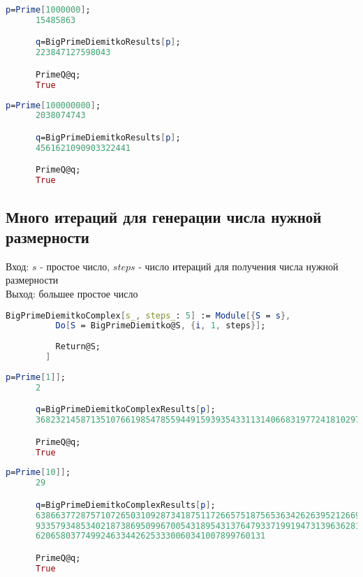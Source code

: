       \begin{lstlisting}[language=Mathematica,caption={Пример 1}]
      p=Prime[1000000];
      15485863

      q=BigPrimeDiemitkoResults[p];
      223847127598043

      PrimeQ@q;
      True
      \end{lstlisting}

      \begin{lstlisting}[language=Mathematica,caption={Пример 2}]
      p=Prime[100000000];
      2038074743

      q=BigPrimeDiemitkoResults[p];
      4561621090903322441

      PrimeQ@q;
      True
      \end{lstlisting}

    \subsection{Много итераций для генерации числа нужной размерности}
    
      Вход: {$s$} - простое число, {$steps$} - число итераций для получения числа нужной размерности \\
      Выход: большее простое число

      \begin{lstlisting}[language=Mathematica,caption={
	     Теорема Диемитко (много итераций)
      }]
    	BigPrimeDiemitkoComplex[s_, steps_: 5] := Module[{S = s},
    	  Do[S = BigPrimeDiemitko@S, {i, 1, steps}];
      
    	  Return@S;
    	]
      \end{lstlisting}

      \begin{lstlisting}[language=Mathematica,caption={Пример 1}]
      p=Prime[1]];
      2

      q=BigPrimeDiemitkoComplexResults[p];
      368232145871351076619854785594491593935433113140668319772418102971192962388774103259613

      PrimeQ@q;
      True
      \end{lstlisting}

      \begin{lstlisting}[language=Mathematica,caption={Пример 2}]
      p=Prime[10]];
      29

      q=BigPrimeDiemitkoComplexResults[p];
      638663772875710726503109287341875117266575187565363426263952126694444214855630831338080281\
      9335793485340218738695099670054318954313764793371991947313963628189825525449\
      6206580377499246334426253330060341007899760131

      PrimeQ@q;
      True
      \end{lstlisting}

